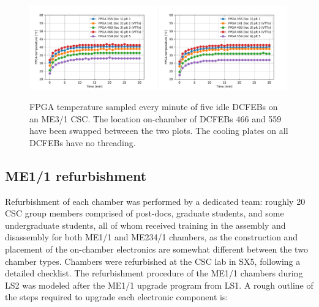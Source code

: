 \begin{figure}[H]
    \centering
    \includegraphics[width=0.49\textwidth]{Images/Phase2Upgrades/DCFEBTempStudy/TempPlot_2019_01_17_nothread12345-5433.pdf}
    \includegraphics[width=0.49\textwidth]{Images/Phase2Upgrades/DCFEBTempStudy/TempPlot_2019_01_17_nothread12354-5430.pdf}
    \caption{FPGA temperature sampled every minute of five idle DCFEBs on an ME3/1 CSC. The location on-chamber of DCFEBs 466 and 559 have been swapped betweeen the two plots. The cooling plates on all DCFEBs have no threading.}
    \label{fig:FPGAtemp2}
\end{figure}

\subsection{ME1/1 refurbishment} \label{sec:ME1/1refurbishment}

Refurbishment of each chamber was performed by a dedicated team: roughly 20 CSC group members comprised of post-docs, graduate students, and some undergraduate students, all of whom received training in the assembly and disassembly for both ME1/1 and ME234/1 chambers, as the construction and placement of the on-chamber electronics are somewhat different between the two chamber types. Chambers were refurbished at the CSC lab in SX5, following a detailed checklist. The refurbishment procedure of the ME1/1 chambers during LS2 was modeled after the ME1/1 upgrade program from LS1. A rough outline of the steps required to upgrade each electronic component is: 

